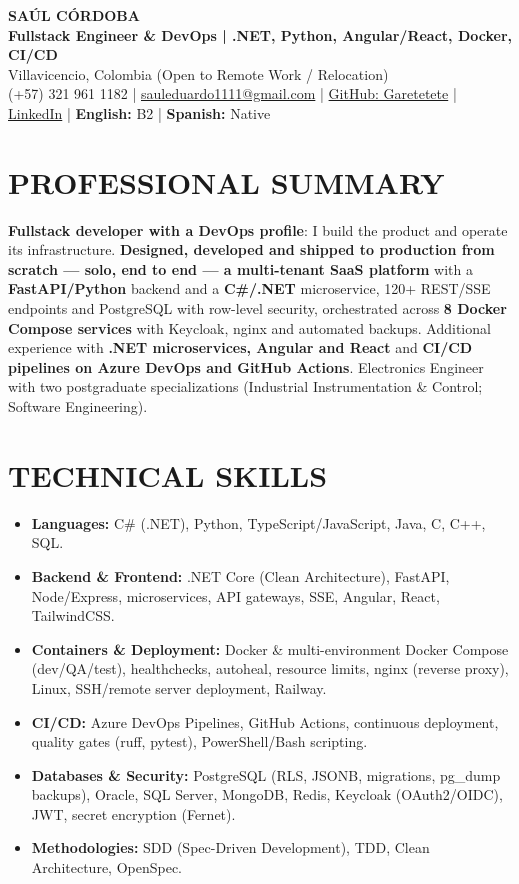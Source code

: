 \documentclass[letterpaper,10pt]{article}
\begin{document}
\begin{center}
    {\Huge \bfseries SAÚL CÓRDOBA} \\[3pt]
    {\Large \textbf{Fullstack Engineer \& DevOps | .NET, Python, Angular/React, Docker, CI/CD}} \\[2pt]
    Villavicencio, Colombia (Open to Remote Work / Relocation) \\
    (+57) 321 961 1182 | \href{mailto:sauleduardo1111@gmail.com}{sauleduardo1111@gmail.com} | \href{https://github.com/Garetetete}{GitHub: Garetetete} | \href{https://www.linkedin.com/in/saul-cordoba-a2997427b}{LinkedIn} | \textbf{English:} B2 | \textbf{Spanish:} Native
\end{center}

\section{PROFESSIONAL SUMMARY}
\textbf{Fullstack developer with a DevOps profile}: I build the product and operate its infrastructure. \textbf{Designed, developed and shipped to production from scratch — solo, end to end — a multi-tenant SaaS platform} with a \textbf{FastAPI/Python} backend and a \textbf{C\#/.NET} microservice, 120+ REST/SSE endpoints and PostgreSQL with row-level security, orchestrated across \textbf{8 Docker Compose services} with Keycloak, nginx and automated backups. Additional experience with \textbf{.NET microservices, Angular and React} and \textbf{CI/CD pipelines on Azure DevOps and GitHub Actions}. Electronics Engineer with two postgraduate specializations (Industrial Instrumentation \& Control; Software Engineering).

\section{TECHNICAL SKILLS}
\begin{itemize}
    \item \textbf{Languages:} C\# (.NET), Python, TypeScript/JavaScript, Java, C, C++, SQL.
    \item \textbf{Backend \& Frontend:} .NET Core (Clean Architecture), FastAPI, Node/Express, microservices, API gateways, SSE, Angular, React, TailwindCSS.
    \item \textbf{Containers \& Deployment:} Docker \& multi-environment Docker Compose (dev/QA/test), healthchecks, autoheal, resource limits, nginx (reverse proxy), Linux, SSH/remote server deployment, Railway.
    \item \textbf{CI/CD:} Azure DevOps Pipelines, GitHub Actions, continuous deployment, quality gates (ruff, pytest), PowerShell/Bash scripting.
    \item \textbf{Databases \& Security:} PostgreSQL (RLS, JSONB, migrations, pg\_dump backups), Oracle, SQL Server, MongoDB, Redis, Keycloak (OAuth2/OIDC), JWT, secret encryption (Fernet).
    \item \textbf{Methodologies:} SDD (Spec-Driven Development), TDD, Clean Architecture, OpenSpec.
\end{itemize}
\end{document}
